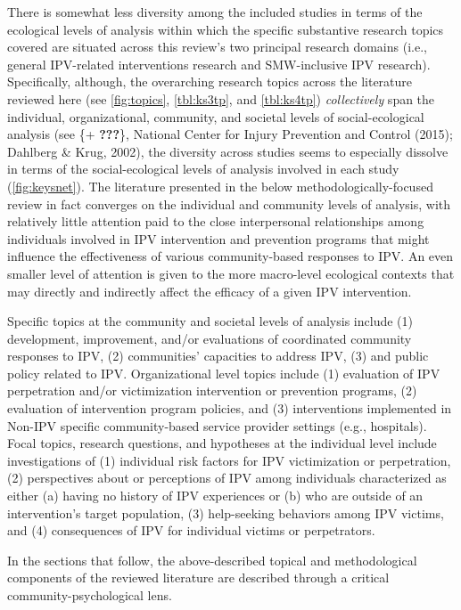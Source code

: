 \documentclass[11pt,]{tufte-book}
\begin{document}
There is somewhat less diversity among the included studies in terms of
the ecological levels of analysis within which the specific substantive
research topics covered are situated across this review's two principal
research domains (i.e., general IPV-related interventions research and
SMW-inclusive IPV research). Specifically, although, the overarching
research topics across the literature reviewed here (see
\cref{fig:topics}, \cref{tbl:ks3tp},
and \cref{tbl:ks4tp}) \emph{collectively} span the
individual, organizational, community, and societal levels of
social-ecological analysis (see \{+ {\textbf{???}}\}, National Center
for Injury Prevention and Control (2015); Dahlberg \& Krug, 2002), the
diversity across studies seems to especially dissolve in terms of the
social-ecological levels of analysis involved in each study
(\cref{fig:keysnet}). The literature presented in the
below methodologically-focused review in fact converges on the
individual and community levels of analysis, with relatively little
attention paid to the close interpersonal relationships among
individuals involved in IPV intervention and prevention programs that
might influence the effectiveness of various community-based responses
to IPV. An even smaller level of attention is given to the more
macro-level ecological contexts that may directly and indirectly affect
the efficacy of a given IPV intervention.

Specific topics at the community and societal levels of analysis include
(1) development, improvement, and/or evaluations of coordinated
community responses to IPV, (2) communities' capacities to address IPV,
(3) and public policy related to IPV. Organizational level topics
include (1) evaluation of IPV perpetration and/or victimization
intervention or prevention programs, (2) evaluation of intervention
program policies, and (3) interventions implemented in Non-IPV specific
community-based service provider settings (e.g., hospitals). Focal
topics, research questions, and hypotheses at the individual level
include investigations of (1) individual risk factors for IPV
victimization or perpetration, (2) perspectives about or perceptions of
IPV among individuals characterized as either (a) having no history of
IPV experiences or (b) who are outside of an intervention's target
population, (3) help-seeking behaviors among IPV victims, and (4)
consequences of IPV for individual victims or perpetrators.

In the sections that follow, the above-described topical and
methodological components of the reviewed literature are described
through a critical community-psychological lens.
\end{document}
